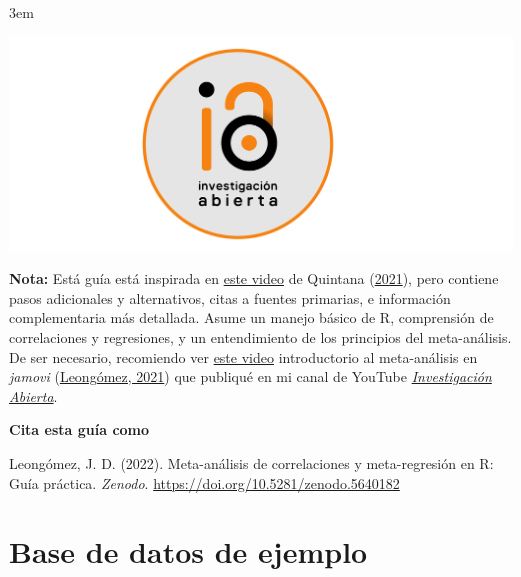 \documentclass[
  bookmarksnumbered]{article}
\begin{document}
\par
\endgroup

\par
\begingroup
\leftskip3em
\rightskip\leftskip
\footnotesize

\href{https://www.youtube.com/@InvestigacionAbierta}{\includegraphics{images/Logo-IA-Rectangulo.pdf}}

\textbf{Nota:} Está guía está inspirada en \href{https://youtu.be/lH4VZMTEZSc}{este video} de Quintana (\protect\hyperlink{ref-quintanaHowPerformMetaanalysis2021}{2021}), pero contiene pasos adicionales y alternativos, citas a fuentes primarias, e información complementaria más detallada. Asume un manejo básico de R, comprensión de correlaciones y regresiones, y un entendimiento de los principios del meta-análisis. De ser necesario, recomiendo ver \href{https://youtu.be/ntBbkOn9D_o}{este video} introductorio al meta-análisis en \emph{jamovi} (\protect\hyperlink{ref-leongomezMetaanalysis2021}{Leongómez, 2021}) que publiqué en mi canal de YouTube \href{https://www.youtube.com/@InvestigacionAbierta}{\emph{Investigación Abierta}}.

\par
\endgroup
\vfill

\textbf{Cita esta guía como } \hrulefill 

\begin{hangparas}{.25in}{1}
Leongómez, J. D. (2022). Meta-análisis de correlaciones y meta-regresión en R: Guía práctica. \textit{Zenodo}. \url{https://doi.org/10.5281/zenodo.5640182}
\end{hangparas}
\newpage

{\hypersetup{hidelinks}
 \setcounter{tocdepth}{5}
 \tableofcontents
}
\newpage

\hypertarget{base-de-datos-de-ejemplo}{%
\section{Base de datos de ejemplo}\label{base-de-datos-de-ejemplo}}
\end{document}
